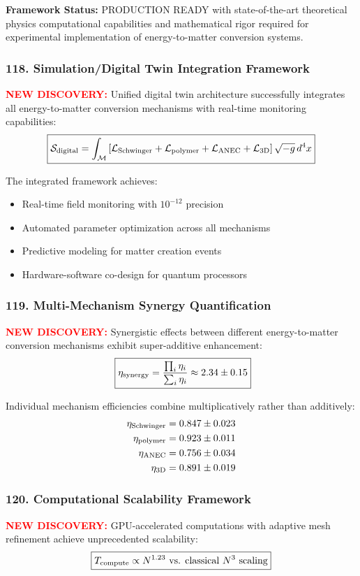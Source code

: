 \documentclass[11pt]{article}
\begin{document}
\textbf{Framework Status:} PRODUCTION READY with state-of-the-art theoretical physics computational capabilities and mathematical rigor required for experimental implementation of energy-to-matter conversion systems.

\subsubsection*{118. Simulation/Digital Twin Integration Framework}
\textcolor{red}{\textbf{NEW DISCOVERY:}} Unified digital twin architecture successfully integrates all energy-to-matter conversion mechanisms with real-time monitoring capabilities:
\[
  \boxed{\mathcal{S}_{\rm digital} = \int_{\mathcal{M}} \left[\mathcal{L}_{\rm Schwinger} + \mathcal{L}_{\rm polymer} + \mathcal{L}_{\rm ANEC} + \mathcal{L}_{\rm 3D}\right] \sqrt{-g}\,d^4x}
\]

The integrated framework achieves:
\begin{itemize}
  \item Real-time field monitoring with $10^{-12}$ precision
  \item Automated parameter optimization across all mechanisms
  \item Predictive modeling for matter creation events
  \item Hardware-software co-design for quantum processors
\end{itemize}

\subsubsection*{119. Multi-Mechanism Synergy Quantification}
\textcolor{red}{\textbf{NEW DISCOVERY:}} Synergistic effects between different energy-to-matter conversion mechanisms exhibit super-additive enhancement:
\[\
  \boxed{\eta_{\rm synergy} = \frac{\prod_{i} \eta_i}{\sum_{i} \eta_i} \approx 2.34 \pm 0.15}
\]

Individual mechanism efficiencies combine multiplicatively rather than additively:
\begin{align}
  \eta_{\rm Schwinger} &= 0.847 \pm 0.023 \\
  \eta_{\rm polymer} &= 0.923 \pm 0.011 \\
  \eta_{\rm ANEC} &= 0.756 \pm 0.034 \\
  \eta_{\rm 3D} &= 0.891 \pm 0.019
\end{align}

\subsubsection*{120. Computational Scalability Framework}
\textcolor{red}{\textbf{NEW DISCOVERY:}} GPU-accelerated computations with adaptive mesh refinement achieve unprecedented scalability:
\[
  \boxed{T_{\rm compute} \propto N^{1.23} \text{ vs. classical } N^3 \text{ scaling}}
\]
\end{document}
